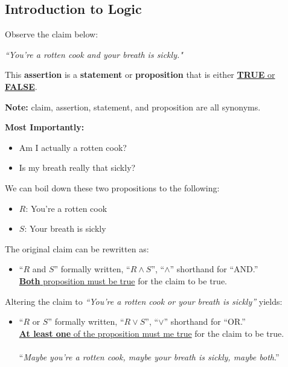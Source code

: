 \subsection{Introduction to Logic}
\vspace{1em}
Observe the claim below:
\vspace{1em}
\begin{center}
    \Large
    \textit{``You're a rotten cook and your breath is sickly."}
\end{center}
\vspace{1em}

\noindent
This \textbf{assertion} is a \textbf{statement} or \textbf{proposition} that is either \underline{\textbf{TRUE} or \textbf{FALSE}}.\\

\vspace{-1em}
\begin{Note}
    \textbf{Note:} claim, assertion, statement, and proposition are all synonyms.
\end{Note}

\vspace{1em}
\noindent
\textbf{Most Importantly:}
\begin{itemize}
    \item Am I actually a rotten cook?
    \item Is my breath really that sickly?
\end{itemize}

\noindent
We can boil down these two propositions to the following:
\begin{itemize}
    \item $R$: You're a rotten cook
    \item $S$: Your breath is sickly
\end{itemize}

\vspace{1em}
\noindent
The original claim can be rewritten as:
\begin{itemize}
    \item ``$R$ and $S$'' formally written, ``$R \land S$'', ``$\land$'' shorthand for ``AND.''\\
          \underline{\textbf{Both} proposition must be true} for the claim to be true.
\end{itemize}

\vspace{1em}
\noindent
Altering the claim to \textit{``You're a rotten cook or your breath is sickly''} yields:
\begin{itemize}
    \item ``$R$ or $S$'' formally written, ``$R \lor S$'', ``$\lor$'' shorthand for ``OR.''\\
          \underline{\textbf{At least one} of the proposition must me true} for the claim to be true.\\\\
          ``\textit{Maybe you're a rotten cook, maybe your breath is sickly, maybe both}.''
\end{itemize}

